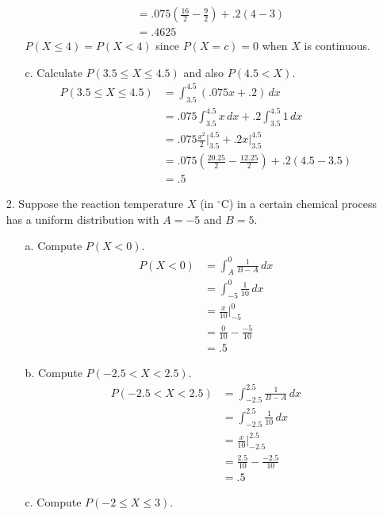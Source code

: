 \documentclass[letterpaper,12pt]{article}
\begin{document}
\begin{enumerate}
\begin{enumerate}
\begin{align*}
          &= .075\left(\frac{16}{2} - \frac{9}{2}\right) + .2(4 - 3) \\
          &= .4625
        \end{align*}
        $P(X \le 4) = P(X < 4)$ since $P(X = c) = 0$ when $X$ is continuous.
      \item[c.]
        Calculate $P(3.5 \le X \le 4.5)$ and also $P(4.5 < X)$.
        \begin{align*}
          P(3.5 \le X \le 4.5) &= \int_{3.5}^{4.5} (.075x + .2)\,dx \\
          &= .075\int_{3.5}^{4.5} x\,dx + .2\int_{3.5}^{4.5} 1\,dx \\
          &= .075\frac{x^2}{2}\bigg\rvert_{3.5}^{4.5} + .2x\big\rvert_{3.5}^{4.5} \\
          &= .075\left(\frac{20.25}{2} - \frac{12.25}{2}\right) + .2(4.5 - 3.5) \\
          &= .5
        \end{align*}
    \end{enumerate}
  \item[2.]
    Suppose the reaction temperature $X$ (in $^\circ$C) in a certain chemical process has a uniform distribution with $A = -5$ and $B = 5$.
    \begin{enumerate}
      \item[a.]
        Compute $P(X < 0)$.
        \begin{align*}
          P(X < 0) &= \int_{A}^{0} \frac{1}{B - A}\,dx \\
          &= \int_{-5}^{0} \frac{1}{10}\,dx \\
          &= \frac{x}{10}\bigg\rvert_{-5}^{0} \\
          &= \frac{0}{10} - \frac{-5}{10} \\
          &= .5
        \end{align*}
      \item[b.]
        Compute $P(-2.5 < X < 2.5)$.
        \begin{align*}
          P(-2.5 < X < 2.5) &= \int_{-2.5}^{2.5} \frac{1}{B - A}\,dx \\
          &= \int_{-2.5}^{2.5} \frac{1}{10}\,dx \\
          &= \frac{x}{10}\bigg\rvert_{-2.5}^{2.5} \\
          &= \frac{2.5}{10} - \frac{-2.5}{10} \\
          &= .5
        \end{align*}
      \item[c.]
        Compute $P(-2 \le X \le 3)$.

\end{enumerate}
\end{enumerate}
\end{document}
